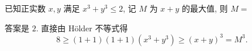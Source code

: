 \begin{prob}
\label{prob:prob-7}
已知正实数 $x, y$ 满足 $x^3 + y^3 \le 2$,
记 $M$ 为 $x + y$ 的最大值, 则 $M = $
\end{prob}

\begin{soln}
答案是 $\boxed{2.}$ 直接由 H\"{o}lder 不等式得
\[
8 \ge (1 + 1)(1 + 1)(x^3 + y^3) \ge (x + y)^3 = M^3.
\]
\end{soln}
